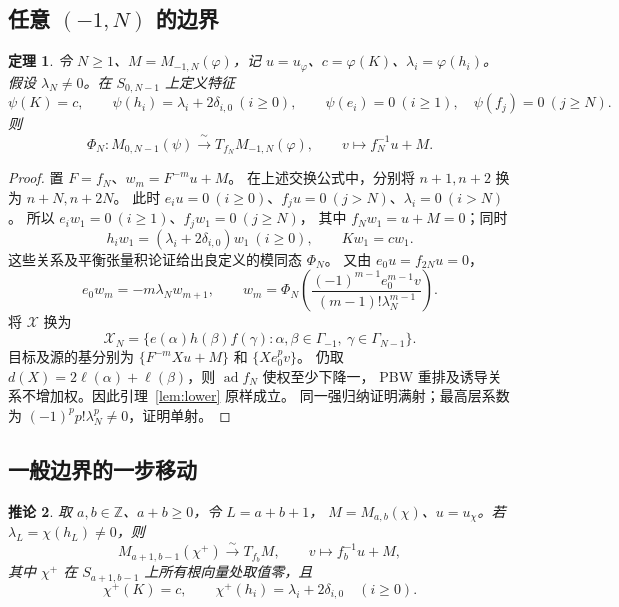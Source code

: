 \documentclass[UTF8,11pt]{ctexart}
\newcommand{\Z}{\mathbb Z}
\newcommand{\ad}{\operatorname{ad}}
\newtheorem{theorem}{定理}
\newtheorem{corollary}[theorem]{推论}
\theoremstyle{definition}
\begin{document}
\subsection{任意 \texorpdfstring{\((-1,N)\)}{(-1,N)} 的边界}

\begin{theorem}\label{thm:N}
令 \(N\ge1\)、\(M=M_{-1,N}(\varphi)\)，记
\(u=u_\varphi\)、\(c=\varphi(K)\)、\(\lambda_i=\varphi(h_i)\)。
假设 \(\lambda_N\ne0\)。在 \(S_{0,N-1}\) 上定义特征
\[
 \psi(K)=c,\qquad \psi(h_i)=\lambda_i+2\delta_{i,0}\ (i\ge0),\qquad
 \psi(e_i)=0\ (i\ge1),\quad \psi(f_j)=0\ (j\ge N).
\]
则
\[
 \Phi_N:M_{0,N-1}(\psi)\xrightarrow{\ \sim\ }T_{f_N}M_{-1,N}(\varphi),
 \qquad v\longmapsto f_N^{-1}u+M.
\]
\end{theorem}

\begin{proof}
置 \(F=f_N\)、\(w_m=F^{-m}u+M\)。
在上述交换公式中，分别将 \(n+1,n+2\) 换为 \(n+N,n+2N\)。
此时 \(e_iu=0\ (i\ge0)\)、\(f_ju=0\ (j>N)\)、\(\lambda_i=0\ (i>N)\)。
所以 \(e_iw_1=0\ (i\ge1)\)、\(f_jw_1=0\ (j\ge N)\)，
其中 \(f_Nw_1=u+M=0\)；同时
\[
 h_iw_1=(\lambda_i+2\delta_{i,0})w_1\ (i\ge0),\qquad Kw_1=cw_1.
\]
这些关系及平衡张量积论证给出良定义的模同态 \(\Phi_N\)。
又由 \(e_0u=f_{2N}u=0\)，
\[
 e_0w_m=-m\lambda_Nw_{m+1},\qquad
 w_m=\Phi_N\left(
   \frac{(-1)^{m-1}e_0^{m-1}v}{(m-1)!\lambda_N^{m-1}}\right).
\]
将 \(\mathcal X\) 换为
\[
 \mathcal X_N=\{e(\alpha)h(\beta)f(\gamma):
       \alpha,\beta\in\Gamma_{-1},\ \gamma\in\Gamma_{N-1}\}.
\]
目标及源的基分别为 \(\{F^{-m}Xu+M\}\) 和 \(\{Xe_0^pv\}\)。
仍取 \(d(X)=2\ell(\alpha)+\ell(\beta)\)，则 \(\ad f_N\) 使权至少下降一，
PBW 重排及诱导关系不增加权。因此引理~\ref{lem:lower} 原样成立。
同一强归纳证明满射；最高层系数为
\((-1)^pp!\lambda_N^p\ne0\)，证明单射。
\end{proof}

\subsection{一般边界的一步移动}

\begin{corollary}\label{cor:general}
取 \(a,b\in\Z\)、\(a+b\ge0\)，令 \(L=a+b+1\)，
\(M=M_{a,b}(\chi)\)、\(u=u_\chi\)。若 \(\lambda_L=\chi(h_L)\ne0\)，则
\[
 M_{a+1,b-1}(\chi^+)\xrightarrow{\ \sim\ }T_{f_b}M,\qquad
 v\longmapsto f_b^{-1}u+M,
\]
其中 \(\chi^+\) 在 \(S_{a+1,b-1}\) 上所有根向量处取值零，且
\[
 \chi^+(K)=c,\qquad \chi^+(h_i)=\lambda_i+2\delta_{i,0}\quad(i\ge0).
\]
\end{corollary}
\end{document}
